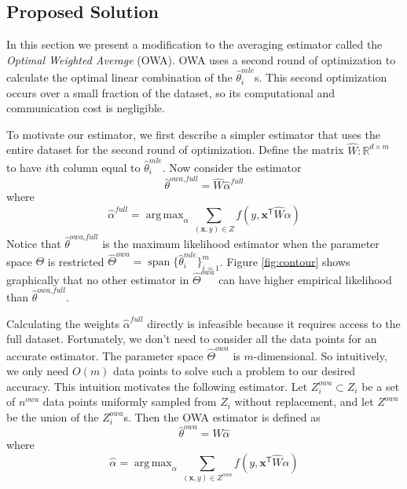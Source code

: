 \documentclass[twoside]{article}
\DeclareMathOperator*{\argmax}{arg\,max}
\DeclareMathOperator*{\vecspan}{span}
\newcommand{\Zreopt}{Z^{\textit{owa}}}
\newcommand{\nreopt}{n^{\textit{owa}}}
\newcommand{\W}{{\hat \Theta^{\textit{owa}}}}
\newcommand{\x}{\mathbf{x}}
\newcommand{\w}{\theta}
\newcommand{\ahat}{\hat\alpha}
\newcommand{\afull}{\ahat^{\textit{full}}}
\newcommand{\wreopt}{\hat\w^{owa}}
\newcommand{\wreoptfull}{\hat\w^{\textit{owa,full}}}
\newcommand{\wmle}{\hat\w^{mle}}
\newcommand{\trans}[1]{\ensuremath{{#1}^{\mathsf{T}}}}
\begin{document}
\subsection{Proposed Solution}

In this section we present a modification to the averaging estimator called the \emph{Optimal Weighted Average} (OWA).
OWA uses a second round of optimization to calculate the optimal linear combination of the $\wmle_i$s.
This second optimization occurs over a small fraction of the dataset,
so its computational and communication cost is negligible.

To motivate our estimator, we first describe a simpler estimator that uses the entire dataset for the second round of optimization.
Define the matrix $\hat W : \mathbb{R}^{d\times m}$ to have $i$th column equal to $\wmle_i$.
Now consider the estimator
\begin{equation}
\wreoptfull = \hat W \afull
\end{equation}
where
\begin{equation}
\afull = \argmax_\alpha \sum _{(\x,y)\in Z} f\left(y,\trans\x \hat W \alpha \right)
\end{equation}
Notice that $\wreoptfull$ is the maximum likelihood estimator when the parameter space $\Theta$ is restricted $\W = \vecspan \{\wmle_i\}_{i=1}^m$.
Figure \ref{fig:contour} shows graphically that no other estimator in $\W$ can have higher empirical likelihood than $\wreoptfull$.

Calculating the weights $\afull$ directly is infeasible because it requires access to the full dataset.
Fortunately, we don't need to consider all the data points for an accurate estimator.
The parameter space $\W$ is $m$-dimensional.
So intuitively, we only need $O(m)$ data points to solve such a problem to our desired accuracy.
This intuition motivates the following estimator.
Let $\Zreopt_i\subset Z_i$ be a set of $\nreopt$ data points uniformly sampled from $Z_i$ without replacement,
and let $\Zreopt$ be the union of the $\Zreopt_i$s.
Then the OWA estimator is defined as
\begin{equation}
\wreopt = \hat W \ahat
\end{equation}
where
\begin{equation}
\ahat = \argmax_\alpha \sum _{(\x,y)\in \Zreopt} f\left(y,\trans\x \hat W \alpha \right)
\end{equation}
\end{document}
